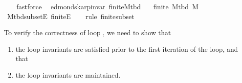 \begin{isabellebody}
\ \ \isamarkupfalse%
\ fastforce%
\endisatagproof
{\isafoldproof}%
%
\isadelimproof
\isanewline
%
\endisadelimproof
%
\isadeliminvisible
\isanewline
%
\endisadeliminvisible
%
\isataginvisible
{}\isamarkupfalse%
\ {\isacharparenleft}{\kern0pt}\ edmonds{\isacharunderscore}{\kern0pt}karp{\isacharunderscore}{\kern0pt}invar{\isacharparenright}{\kern0pt}\ finite{\isacharunderscore}{\kern0pt}M{\isacharunderscore}{\kern0pt}tbd{\isacharcolon}{\kern0pt}\isanewline
\ \ \ {\isachardoublequoteopen}finite\ {\isacharparenleft}{\kern0pt}M{\isacharunderscore}{\kern0pt}tbd\ M{\isacharparenright}{\kern0pt}{\isachardoublequoteclose}%
\endisataginvisible
{\isafoldinvisible}%
%
\isadeliminvisible
\isanewline
%
\endisadeliminvisible
%
\isadelimproof
\ \ %
\endisadelimproof
%
\isatagproof
{}\isamarkupfalse%
\ M{\isacharunderscore}{\kern0pt}tbd{\isacharunderscore}{\kern0pt}subset{\isacharunderscore}{\kern0pt}E\ finite{\isacharunderscore}{\kern0pt}E\isanewline
\ \ \isamarkupfalse%
\ {\isacharparenleft}{\kern0pt}rule\ finite{\isacharunderscore}{\kern0pt}subset{\isacharparenright}{\kern0pt}%
\endisatagproof
{\isafoldproof}%
%
\isadelimproof
%
\endisadelimproof
%
\begin{isamarkuptext}%
To verify the correctness of loop , we need to show that

%
\begin{enumerate}%
\item the loop invariants are satisfied prior to the first iteration of the loop, and that

\item the loop invariants are maintained.%
\end{enumerate}



\end{isamarkuptext}
\end{isabellebody}
